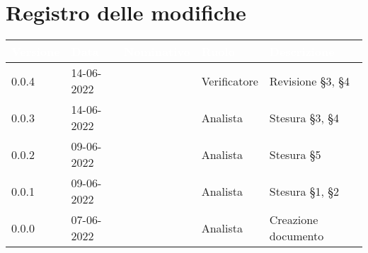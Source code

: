 \section*{Registro delle modifiche}
{

\newlength{\freewidth}
\setlength{\freewidth}{\dimexpr\textwidth-10\tabcolsep}
\renewcommand{\arraystretch}{1.5}
\centering
\setlength{\aboverulesep}{0pt}
\setlength{\belowrulesep}{0pt}
\begin{longtable}{C{.13\freewidth} C{.15\freewidth} C{.26\freewidth} C{.18\freewidth} C{.282379\freewidth}}
	\toprule
{}
\textcolor{white}{\textbf{Versione}}&
\textcolor{white}{\textbf{Data}}&
\textcolor{white}{\textbf{Nominativo}}&
\textcolor{white}{\textbf{Ruolo}}&
\textcolor{white}{\textbf{Descrizione}}\\	
\toprule
\endhead

0.0.4 & 14-06-2022 & \matteo{} & Verificatore & Revisione \S 3, \S 4\\
0.0.3 & 14-06-2022 & \ruth{} & Analista & Stesura \S 3, \S 4\\
0.0.2 & 09-06-2022 & \matteo{} & Analista & Stesura \S 5\\
0.0.1 & 09-06-2022 & \marcob{} & Analista & Stesura \S 1, \S 2\\
0.0.0 & 07-06-2022 & \matteo{} & Analista & Creazione documento\\	
\bottomrule
\end{longtable}
}
